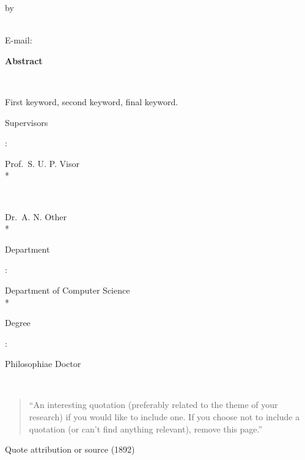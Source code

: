 
\newpage

\begin{center}
	{\large\bf {}}
\end{center}
\begin{center}by\end{center}
\begin{center}
	{}\\
		E-mail: \href{mailto:}{\directlua{value(email)}}
\end{center}
\vspace{1cm}
\begin{center}{\large\bf Abstract}\end{center}
\noindent\

 First keyword, second keyword, final keyword.

\vfill
\noindent
{\bf\parbox{26.8mm}{Supervisors}:} Prof.~S. U. P. Visor \\* %
{\bf\parbox{28.55mm}{~}} Dr.~A. N. Other \\*
{\bf\parbox{26.8mm}{Department}:} Department of Computer Science \\*
{\bf\parbox{26.8mm}{Degree}:} Philosophiae Doctor


\newpage

\ 

\begin{quotation}
``An interesting quotation (preferably related to the theme of your research) if you would like to include one. If you choose not to include a quotation (or can't find anything relevant), remove this page.''
\end{quotation}
\begin{flushright}
Quote attribution or source (1892)
\end{flushright}

\vspace{1cm}

